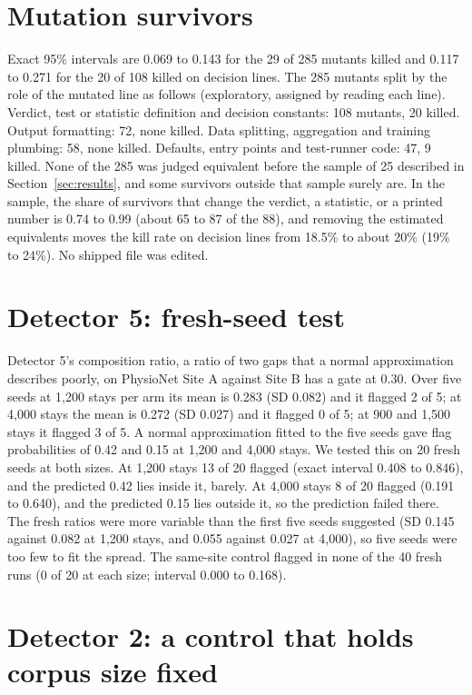 \documentclass[10pt]{article}
\theoremstyle{definition}
\begin{document}
\section{Mutation survivors}
\label{apd:mutation}
Exact 95\% intervals are 0.069 to 0.143 for the 29 of 285 mutants killed and 0.117 to 0.271 for the 20 of 108 killed on decision lines. The 285 mutants split by the role of the mutated line as follows (exploratory, assigned by reading each line). Verdict, test or statistic definition and decision constants: 108 mutants, 20 killed. Output formatting: 72, none killed. Data splitting, aggregation and training plumbing: 58, none killed. Defaults, entry points and test-runner code: 47, 9 killed. None of the 285 was judged equivalent before the sample of 25 described in Section~\ref{sec:results}, and some survivors outside that sample surely are. In the sample, the share of survivors that change the verdict, a statistic, or a printed number is 0.74 to 0.99 (about 65 to 87 of the 88), and removing the estimated equivalents moves the kill rate on decision lines from 18.5\% to about 20\% (19\% to 24\%). No shipped file was edited.

\section{Detector 5: fresh-seed test}
\label{apd:d5}
Detector 5's composition ratio, a ratio of two gaps that a normal approximation describes poorly, on PhysioNet Site A against Site B has a gate at 0.30. Over five seeds at 1,200 stays per arm its mean is 0.283 (SD 0.082) and it flagged 2 of 5; at 4,000 stays the mean is 0.272 (SD 0.027) and it flagged 0 of 5; at 900 and 1,500 stays it flagged 3 of 5. A normal approximation fitted to the five seeds gave flag probabilities of 0.42 and 0.15 at 1,200 and 4,000 stays. We tested this on 20 fresh seeds at both sizes. At 1,200 stays 13 of 20 flagged (exact interval 0.408 to 0.846), and the predicted 0.42 lies inside it, barely. At 4,000 stays 8 of 20 flagged (0.191 to 0.640), and the predicted 0.15 lies outside it, so the prediction failed there. The fresh ratios were more variable than the first five seeds suggested (SD 0.145 against 0.082 at 1,200 stays, and 0.055 against 0.027 at 4,000), so five seeds were too few to fit the spread. The same-site control flagged in none of the 40 fresh runs (0 of 20 at each size; interval 0.000 to 0.168).

\section{Detector 2: a control that holds corpus size fixed}
\label{sec:detector2}
\end{document}
